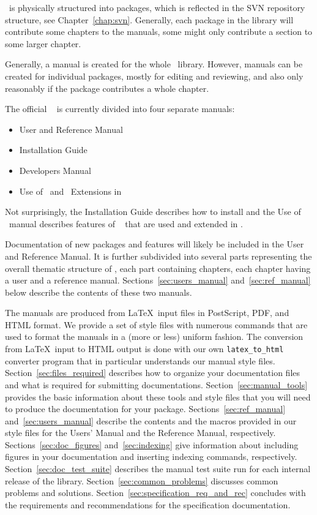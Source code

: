 \cgal\ is physically structured into
packages, which is reflected in the SVN
repository structure, see Chapter~\ref{chap:svn}.  Generally, each
package in the library will contribute some chapters to the manuals,
some might only contribute a section to some larger chapter.

Generally, a manual is created for the whole \cgal\ library.
However, manuals can be created for individual packages,
mostly for editing and reviewing, and also only reasonably if the
package contributes a whole chapter.

The official \cgal\
is currently divided into four separate manuals:
\begin{itemize}
   \item User and Reference Manual
   \item Installation Guide
   \item Developers Manual
   \item Use of \stl\ and \stl\ Extensions in \cgal
\end{itemize}
Not surprisingly, the Installation Guide describes how to install \cgal
\ccIndexMainItem{installation} and the Use of \stl\ manual describes
features of \stl\ \ccIndexMainItem{\stl} that are used and extended in \cgal.

Documentation of new packages and features will likely be included in
the User and Reference Manual.  It is further
subdivided into several parts representing the overall thematic structure
of \cgal, each part containing chapters, each chapter having a user
and a reference manual.
Sections~\ref{sec:users_manual} and~\ref{sec:ref_manual} below
describe the contents of these two manuals.

The manuals are produced from \LaTeX\ input files in PostScript, PDF, and
HTML format. We provide a set of style files with numerous commands
that are used to format the manuals in a (more or less) uniform fashion.
The conversion from \LaTeX\ input to HTML output is done with
our own \texttt{latex\_to\_html} converter program that in particular
understands our manual style files.
Section~\ref{sec:files_required} describes how to organize your
documentation files and what is required for submitting documentations.
Section~\ref{sec:manual_tools} provides the basic information about
these tools and style files that you will need to produce
the documentation for your package.
Sections~\ref{sec:ref_manual} and~\ref{sec:users_manual} describe the
contents and the macros provided in our style files for the Users'
Manual and the Reference Manual, respectively.
Sections~\ref{sec:doc_figures} and~\ref{sec:indexing} give information
about including figures in your documentation and inserting indexing
commands, respectively.
Section~\ref{sec:doc_test_suite} describes the manual test suite run
for each internal release of the library.
Section~\ref{sec:common_problems} discusses common problems and
solutions.
Section~\ref{sec:specification_req_and_rec} concludes with the
requirements and recommendations for the specification documentation.

